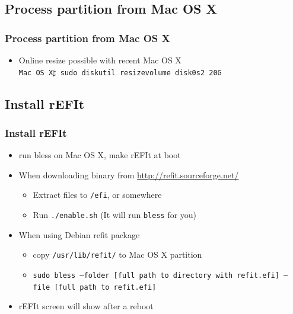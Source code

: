 \documentclass[cjk,dvipdfm]{beamer}
\begin{document}
\subsection{Process partition from Mac OS X}

\begin{frame}
 \frametitle{Process partition from Mac OS X}
\begin{itemize}
 \item Online resize possible with recent Mac OS X\\
       \texttt{Mac OS X$\sharp$  sudo diskutil resizevolume disk0s2 20G}
\end{itemize}
\end{frame}

\subsection{Install rEFIt}

\begin{frame}
 \frametitle{Install rEFIt}
 \begin{itemize}
  \item run bless on Mac OS X, make rEFIt at boot
  \item When downloading binary from \url{http://refit.sourceforge.net/}
  \begin{itemize}
   \item Extract files to \texttt{/efi}, or somewhere
   \item Run \texttt{./enable.sh} (It will run \texttt{bless} for you)
  \end{itemize} 
  \item When using Debian refit package
  \begin{itemize}
   \item copy \texttt{/usr/lib/refit/} to Mac OS X partition
   \item \texttt{sudo bless --folder [full path to directory with
	 refit.efi] --file [full path to refit.efi]}
  \end{itemize}
 \item rEFIt screen will show after a reboot
 \end{itemize}
\end{frame}
\end{document}
